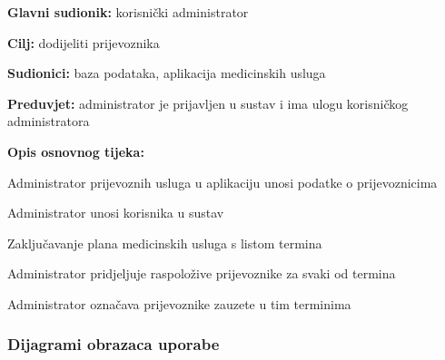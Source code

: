                         \noindent {}
					\begin{packed_item}
	
						\item \textbf{Glavni sudionik: }korisnički administrator
						\item  \textbf{Cilj:} dodijeliti prijevoznika
						\item  \textbf{Sudionici:} baza podataka, aplikacija medicinskih usluga
						\item  \textbf{Preduvjet:} administrator je prijavljen u sustav i ima ulogu korisničkog administratora 
						\item  \textbf{Opis osnovnog tijeka:}
						
						\item[] \begin{packed_enum}
	
							\item Administrator prijevoznih usluga u aplikaciju unosi podatke o prijevoznicima
                                \item Administrator unosi korisnika u sustav
                                \item Zaključavanje plana medicinskih usluga s listom termina
                                \item Administrator pridjeljuje raspoložive prijevoznike za svaki od termina
                                \item Administrator označava prijevoznike zauzete u tim terminima
						\end{packed_enum}
						
					\end{packed_item}
                        
				
					
				\subsubsection{Dijagrami obrazaca uporabe}
					
